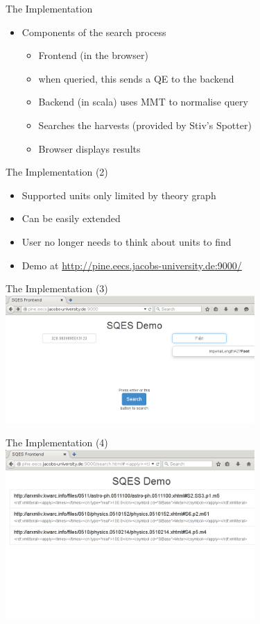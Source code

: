 \documentclass{beamer}
\begin{document}
  \begin{frame}{The Implementation}
    \begin{itemize}[<+->]
      \item Components of the search process
      \begin{itemize}
        \item Frontend (in the browser)
        \item when queried, this sends a QE to the backend
        \item Backend (in scala) uses MMT to normalise query
        \item Searches the harvests (provided by Stiv's Spotter)
        \item Browser displays results
      \end{itemize}
    \end{itemize}
  \end{frame}

  \begin{frame}{The Implementation (2)}
    \begin{itemize}[<+->]
      \item Supported units only limited by theory graph
      \item Can be easily extended
      \item User no longer needs to think about units to find
      \item Demo at \url{http://pine.eecs.jacobs-university.de:9000/}
    \end{itemize}
  \end{frame}

  \begin{frame}{The Implementation (3)}
    \includegraphics[width=95mm]{imgs/screen1.png}
  \end{frame}

  \begin{frame}{The Implementation (4)}
    \includegraphics[width=95mm]{imgs/screen2.png}
  \end{frame}
\end{document}
